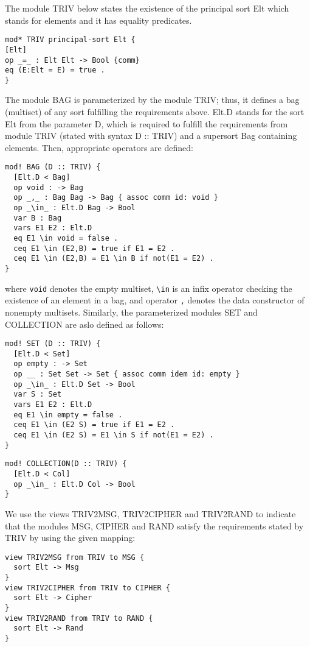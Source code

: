 \documentclass[a4paper,fleqn]{cas-dc}
\begin{document}
The module TRIV below states the existence of the principal sort Elt which
stands for elements and it has equality predicates.
\begin{small}
\begin{verbatim}
mod* TRIV principal-sort Elt {
[Elt]
op _=_ : Elt Elt -> Bool {comm}
eq (E:Elt = E) = true .
}
\end{verbatim}
\end{small}
The module BAG is parameterized by the module TRIV; thus, it defines a bag (multiset) of any sort fulfilling the requirements above. Elt.D stands for the sort Elt from the parameter D, which is required to fulfill the requirements from module TRIV (stated with syntax D :: TRIV) and a supersort Bag containing elements. Then, appropriate operators are defined:
\begin{small}
\begin{verbatim}
mod! BAG (D :: TRIV) {
  [Elt.D < Bag]
  op void : -> Bag
  op _,_ : Bag Bag -> Bag { assoc comm id: void }
  op _\in_ : Elt.D Bag -> Bool
  var B : Bag
  vars E1 E2 : Elt.D
  eq E1 \in void = false .
  ceq E1 \in (E2,B) = true if E1 = E2 .
  ceq E1 \in (E2,B) = E1 \in B if not(E1 = E2) .
}
\end{verbatim}
\end{small}
where \verb!void! denotes the empty multiset, \verb!\in! is an infix operator checking the existence of an element in a bag, and operator \verb!,! denotes the data constructor of nonempty multisets. Similarly, the parameterized modules SET and COLLECTION are aslo defined as follows:
\begin{small}
\begin{verbatim}
mod! SET (D :: TRIV) {
  [Elt.D < Set]
  op empty : -> Set
  op __ : Set Set -> Set { assoc comm idem id: empty }
  op _\in_ : Elt.D Set -> Bool
  var S : Set
  vars E1 E2 : Elt.D
  eq E1 \in empty = false .
  ceq E1 \in (E2 S) = true if E1 = E2 .
  ceq E1 \in (E2 S) = E1 \in S if not(E1 = E2) .
}
\end{verbatim}
\end{small}
\begin{small}
\begin{verbatim}
mod! COLLECTION(D :: TRIV) {
  [Elt.D < Col]
  op _\in_ : Elt.D Col -> Bool
}
\end{verbatim}
\end{small}

We use the views TRIV2MSG, TRIV2CIPHER and TRIV2RAND to indicate that the modules MSG, CIPHER and RAND satisfy the requirements stated by TRIV by using the given mapping:
\begin{small}
\begin{verbatim}
view TRIV2MSG from TRIV to MSG {
  sort Elt -> Msg
}
view TRIV2CIPHER from TRIV to CIPHER {
  sort Elt -> Cipher
}
view TRIV2RAND from TRIV to RAND {
  sort Elt -> Rand
}
\end{verbatim}
\end{small}
\end{document}

